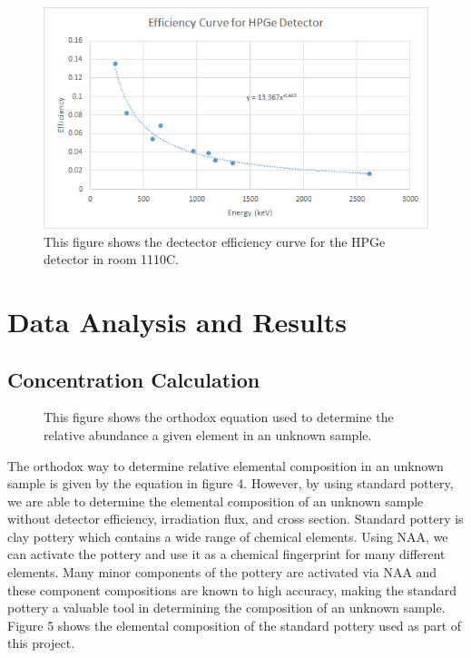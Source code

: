 \documentclass[]{article}
\begin{document}
\begin{figure}[h]
\centering
\includegraphics[scale=0.6]{Efficiency}
\caption{This figure shows the dectector efficiency curve for the HPGe detector in room 1110C.}
\end{figure} 

\pagebreak
 

\section{Data Analysis and Results}
\subsection{Concentration Calculation}

\begin{figure}[h]
\centering
{}
\caption{This figure shows the orthodox equation used to determine the relative abundance a given element in an unknown sample.}
\end{figure}

The orthodox way to determine relative elemental composition in an unknown sample is given by the equation in figure 4. However, by using standard pottery, we are able to determine the elemental composition of an unknown sample without detector efficiency, irradiation flux, and cross section. Standard pottery is clay pottery which contains a wide range of chemical elements. Using NAA, we can activate the pottery and use it as a chemical fingerprint for many different elements. Many minor components of the pottery are activated via NAA and these component compositions are known to high accuracy, making the standard pottery a valuable tool in determining the composition of an unknown sample. Figure 5 shows the elemental composition of the standard pottery used as part of this project.
\end{document}
